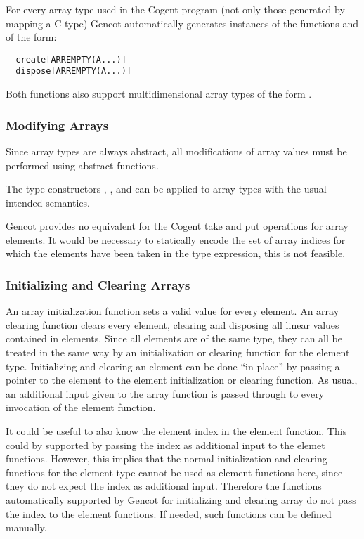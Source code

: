 For every array type  used in the Cogent program (not only those generated by mapping a C type) Gencot automatically
generates instances of the functions  and  of the form:
\begin{verbatim}
  create[ARREMPTY(A...)]
  dispose[ARREMPTY(A...)]
\end{verbatim}

Both functions also support multidimensional array types of the form .

\subsubsection{Modifying Arrays}

Since array types are always abstract, all modifications of array values must be performed using abstract functions.

The type constructors , , and  can be applied to array types with the 
usual intended semantics. 

Gencot provides no equivalent for the Cogent take and put operations for array elements. It would be
necessary to statically encode the set of array indices for which the elements have been taken in the type expression,
this is not feasible.

\subsubsection{Initializing and Clearing Arrays}

An array initialization function sets a valid value for every element. An array clearing function clears every element, 
clearing and disposing all linear values contained in elements. Since all elements are of the same type, they can all be
treated in the same way by an initialization or clearing function for the element type. Initializing and clearing an element
can be done ``in-place'' by passing a pointer to the element to the element initialization or clearing function. As usual,
an additional input given to the array function is passed through to every invocation of the element function. 

It could be useful to also know the element index in the element function. This could by supported by passing the index
as additional input to the elemet functions. However, this implies that the normal initialization and clearing functions
for the element type cannot be used as element functions here, since they do not expect the index as additional input.
Therefore the functions automatically supported by Gencot for initializing and clearing array do not pass the index 
to the element functions. If needed, such functions can be defined manually.

